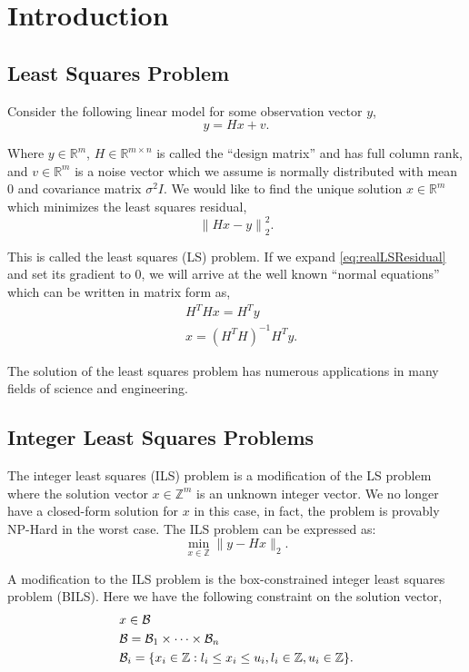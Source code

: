 \documentclass[12pt,Bold,letterpaper]{mcgilletdclass}
\newcommand{\be}{\begin{equation}}
\newcommand{\ee}{\end{equation}}
\newcommand{\boxcon}{{\cal B}}
\begin{document}
 
\chapter{Introduction}
\section{Least Squares Problem}
Consider the following linear model for some observation vector $y$,
\begin{equation}
\label{eq:realLSModel}
y = Hx+v.
\end{equation}

Where $y\in\mathbb{R}^m$, $H\in\mathbb{R}^{m \times n}$ is called the
``design matrix'' and has full column rank, and $v\in\mathbb{R}^m$ is a
noise vector which we assume is normally distributed with mean $0$ and
covariance matrix $\sigma^2I$. We would like to find the unique solution
$x\in\mathbb{R}^m$ which minimizes the least squares residual,
\be
\label{eq:realLSResidual}
 \left \| Hx - y \right \|^2_2.
\ee

This is called the least squares (LS) problem. If we expand
\eqref{eq:realLSResidual} and set its gradient to $0$, we will arrive at the
well known ``normal equations'' which can be written in matrix form as,
\begin{align}
&H^THx = H^Ty \\
\label{eq:normalEquations}
&x = (H^TH)^{-1}H^Ty.
\end{align}

The solution of the least squares problem has numerous applications in many fields of science and engineering.

\section{Integer Least Squares Problems}
The integer least squares (ILS) problem is a modification of the LS problem
where the solution vector $x\in\mathbb{Z}^m$ is an unknown integer vector. We
no longer have a closed-form solution for $x$ in this case, in fact, the
problem is provably NP-Hard in the worst case. The ILS problem can be expressed as:
\be
\label{eq:ils0}
\min_{x\in {\mathbb{Z} }}  \| y- Hx \|_2. 
\ee

A modification to the ILS problem is the box-constrained integer least squares
problem (BILS). Here we have the following constraint on the solution
vector, 
\begin{align} \label{eq:boxCon}
&x\in \boxcon\\
&{\cal B} = {\cal B}_1  \times \cdots \times {\cal B}_n\\
&\boxcon_i = \{x_i\in\mathbb{Z} : l_i\le x_i \le u_i, l_i\in \mathbb{Z},
u_i\in\mathbb{Z} \}.
\end{align}
\end{document}

